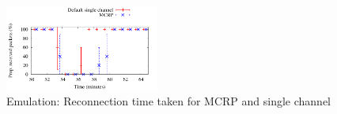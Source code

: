 \begin{figure}
\centering
\includegraphics[width=0.45\textwidth]{figures/reconnect.pdf}
\caption{Emulation: Reconnection time taken for MCRP and single channel}
\label{fig:reconnection}
\end{figure}



